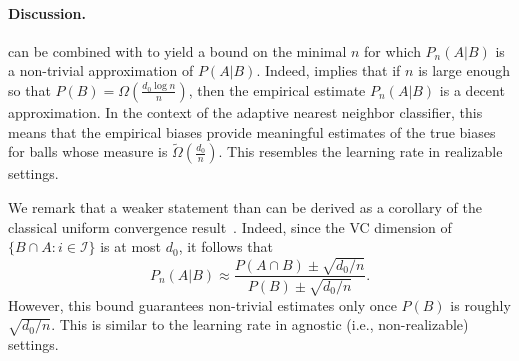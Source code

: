 \documentclass{article}
\def\B{{\mathcal B}}
\newcommand{\I}{\mathcal{I}}
\newtheorem{lemma}[theorem]{Lemma}
\newcommand{\comment}[3]{{\color{#1} {\bf #2 :} #3}}
\newcommand{\shay}[1]{\comment{purple}{Shay}{#1}}
\begin{document}
\paragraph{Discussion.}
 can be combined with 
to yield a bound on the minimal $n$ for which $P_n(A \vert B)$ 
is a non-trivial approximation of $P(A \vert B)$.
Indeed,  implies that 
if $n$ is large enough so that $P(B)=\Omega\left(\frac{d_0\log n}{n}\right)$, 
then the empirical estimate $P_n(A\vert B)$ is a decent approximation.
In the context of the adaptive nearest neighbor classifier, this means that the empirical
biases provide meaningful estimates of the true biases for balls whose measure is $\tilde\Omega\left(\frac{d_0}{n}\right)$.
This resembles the learning rate in realizable settings.
%
%

We remark that a weaker statement than 
can be derived as a corollary of the classical uniform convergence
result~\citep{vapnik1971uniform}. 
Indeed, since the VC dimension of $\{B\cap A : i\in \I\}$ is at most $d_0$, it follows that 
\[P_n(A\vert B)\approx\frac{P(A\cap B) \pm \sqrt{d_0 / n}}{P(B)\pm \sqrt{d_0 / n}}.\]
However, this bound guarantees non-trivial estimates only once $P(B)$ is roughly $\sqrt{d_0  / n}$.
This is similar to the learning rate in agnostic (i.e., non-realizable) settings.
\end{document}
